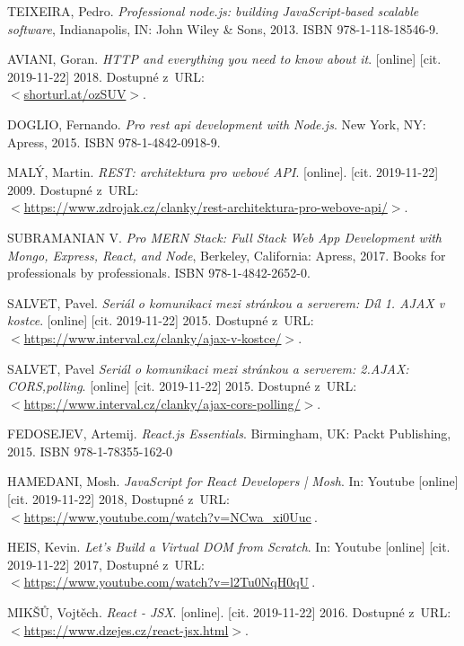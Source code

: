 \begin{literatura}{99}
	TEIXEIRA, Pedro. 
	\emph{Professional node.js: building JavaScript-based scalable software}, 
	Indianapolis, IN: John Wiley \& Sons, 2013. ISBN 978-1-118-18546-9.

	AVIANI, Goran.
	\emph{HTTP and everything you need to know about it}. [online] [cit. 2019-11-22]
	2018. Dostupné z~URL:\\ 
	\(<\)\url{shorturl.at/ozSUV}\(>\).

	DOGLIO, Fernando. 
	\emph{Pro rest api development with Node.js}. 
	New York, NY: Apress, 2015. ISBN 978-1-4842-0918-9.

	MALÝ, Martin.
	\emph{REST: architektura pro webové API}. [online]. [cit. 2019-11-22]
	2009. Dostupné z~URL:\\ \(<\)\url{https://www.zdrojak.cz/clanky/rest-architektura-pro-webove-api/}\(>\).

	SUBRAMANIAN V.
	\emph{Pro MERN Stack: Full Stack Web App Development with Mongo, Express, React, and Node},
	Berkeley, California: Apress, 2017. Books for professionals by professionals. ISBN 978-1-4842-2652-0.

	SALVET, Pavel.
	\emph{Seriál o komunikaci mezi stránkou a serverem: Díl 1. AJAX v kostce}. [online] [cit. 2019-11-22]
	2015. Dostupné z~URL:\\ \(<\)\url{https://www.interval.cz/clanky/ajax-v-kostce/}\(>\).

	SALVET, Pavel
	\emph{Seriál o komunikaci mezi stránkou a serverem: 2.AJAX: CORS,polling}. [online] [cit. 2019-11-22]
	2015. Dostupné z~URL:\\ \(<\)\url{https://www.interval.cz/clanky/ajax-cors-polling/}\(>\).

	FEDOSEJEV, Artemij.
	\emph{React.js Essentials}.
	Birmingham, UK: Packt Publishing, 2015. ISBN 978-1-78355-162-0

	HAMEDANI, Mosh.
	\emph{JavaScript for React Developers | Mosh}. In: Youtube [online] [cit. 2019-11-22]
	2018, Dostupné z~URL:\\ \(<\)\url{https://www.youtube.com/watch?v=NCwa_xi0Uuc}\(\>\).

	HEIS, Kevin.
	\emph{Let's Build a Virtual DOM from Scratch}. In: Youtube [online] [cit. 2019-11-22]
	2017, Dostupné z~URL:\\ \(<\)\url{https://www.youtube.com/watch?v=l2Tu0NqH0qU}\(\>\).

	MIKŠŮ, Vojtěch.
	\emph{React - JSX}. [online]. [cit. 2019-11-22]
	2016. Dostupné z~URL:\\ 
	\(<\)\url{https://www.dzejes.cz/react-jsx.html}\(>\).


\end{literatura}

